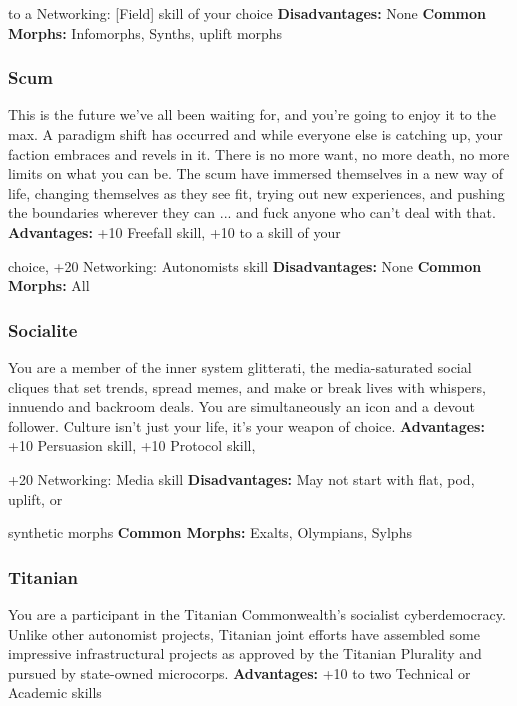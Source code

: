 to a Networking: [Field] skill of your choice
\textbf{Disadvantages:} None
\textbf{Common Morphs:} Infomorphs, Synths, uplift morphs

\subsubsection{Scum}

This is the future we've all been waiting for, and you're 
going to enjoy it to the max. A paradigm shift has occurred
and while everyone else is catching up, your
faction embraces and revels in it. There is no more 
want, no more death, no more limits on what you can 
be. The scum have immersed themselves in a new way 
of life, changing themselves as they see fit, trying out 
new experiences, and pushing the boundaries wherever 
they can ... and fuck anyone who can't deal with that.
\textbf{Advantages:} +10 Freefall skill, +10 to a skill of your 

choice, +20 Networking: Autonomists skill
\textbf{Disadvantages:} None
\textbf{Common Morphs:} All

\subsubsection{Socialite}

You are a member of the inner system glitterati, the 
media-saturated social cliques that set trends, spread 
memes, and make or break lives with whispers, innuendo
and backroom deals. You are simultaneously
an icon and a devout follower. Culture isn't just your 
life, it's your weapon of choice.
\textbf{Advantages:} +10 Persuasion skill, +10 Protocol skill, 

+20 Networking: Media skill
\textbf{Disadvantages:} May not start with flat, pod, uplift, or 

synthetic morphs
\textbf{Common Morphs:} Exalts, Olympians, Sylphs

\subsubsection{Titanian}

You are a participant in the Titanian Commonwealth's 
socialist cyberdemocracy. Unlike other autonomist 
projects, Titanian joint efforts have assembled some 
impressive infrastructural projects as approved by 
the Titanian Plurality and pursued by state-owned 
microcorps.
\textbf{Advantages:} +10 to two Technical or Academic skills 

